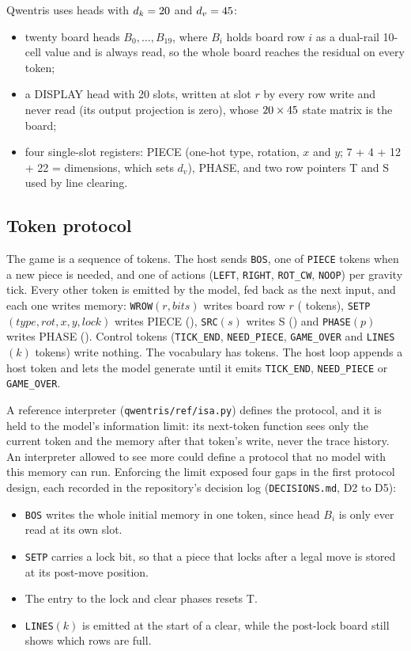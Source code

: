 \documentclass[11pt]{article}
\newcommand{\tok}[1]{\texttt{#1}}
\begin{document}
Qwentris uses \nHeads{} heads with $d_k = 20$ and $d_v = 45$:
\begin{itemize}
\item twenty board heads $B_0, \dots, B_{19}$, where $B_i$ holds board row $i$ as a dual-rail 10-cell value and is always read, so the whole board reaches the residual on every token;
\item a DISPLAY head with 20 slots, written at slot $r$ by every row write and never read (its output projection is zero), whose $20 \times 45$ state matrix is the board;
\item four single-slot registers: PIECE (one-hot type, rotation, $x$ and $y$; 7 + 4 + 12 + 22 = \nVdim{} dimensions, which sets $d_v$), PHASE, and two row pointers T and S used by line clearing.
\end{itemize}

\subsection{Token protocol}
\label{sec:protocol}

The game is a sequence of tokens. The host sends \tok{BOS}, one of \nVocPiece{} \tok{PIECE} tokens when a new piece is needed, and one of \nVocAct{} actions (\tok{LEFT}, \tok{RIGHT}, \tok{ROT\_CW}, \tok{NOOP}) per gravity tick. Every other token is emitted by the model, fed back as the next input, and each one writes memory: \tok{WROW}$(r, \mathit{bits})$ writes board row $r$ (\nVocWrow{} tokens), \tok{SETP}$(\mathit{type}, \mathit{rot}, x, y, \mathit{lock})$ writes PIECE (\nVocSetp{}), \tok{SRC}$(s)$ writes S (\nVocSrc{}) and \tok{PHASE}$(p)$ writes PHASE (\nVocPhase{}). Control tokens (\tok{TICK\_END}, \tok{NEED\_PIECE}, \tok{GAME\_OVER} and \nVocLines{} \tok{LINES}$(k)$ tokens) write nothing. The vocabulary has \nVocab{} tokens. The host loop appends a host token and lets the model generate until it emits \tok{TICK\_END}, \tok{NEED\_PIECE} or \tok{GAME\_OVER}.

A reference interpreter (\texttt{qwentris/ref/isa.py}) defines the protocol, and it is held to the model's information limit: its next-token function sees only the current token and the memory after that token's write, never the trace history. An interpreter allowed to see more could define a protocol that no model with this memory can run. Enforcing the limit exposed four gaps in the first protocol design, each recorded in the repository's decision log (\texttt{DECISIONS.md}, D2 to D5):
\begin{itemize}
\item \tok{BOS} writes the whole initial memory in one token, since head $B_i$ is only ever read at its own slot.
\item \tok{SETP} carries a lock bit, so that a piece that locks after a legal move is stored at its post-move position.
\item The entry to the lock and clear phases resets T.
\item \tok{LINES}$(k)$ is emitted at the start of a clear, while the post-lock board still shows which rows are full.
\end{itemize}
\end{document}
